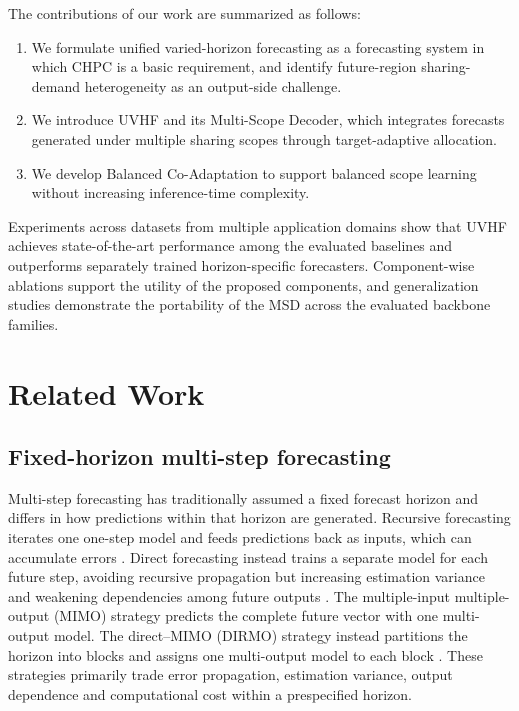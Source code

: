 \documentclass[final,3p,times]{elsarticle}
\begin{document}
The contributions of our work are summarized as follows:

\begin{enumerate}
\item We formulate unified varied-horizon forecasting as a forecasting system in which CHPC is a basic requirement, and identify future-region sharing-demand heterogeneity as an output-side challenge.
\item We introduce UVHF and its Multi-Scope Decoder, which integrates forecasts generated under multiple sharing scopes through target-adaptive allocation.
\item We develop Balanced Co-Adaptation to support balanced scope learning without increasing inference-time complexity.
\end{enumerate}

Experiments across datasets from multiple application domains show that UVHF achieves state-of-the-art performance among the evaluated baselines and outperforms separately trained horizon-specific forecasters. Component-wise ablations support the utility of the proposed components, and generalization studies demonstrate the portability of the MSD across the evaluated backbone families.

\section{Related Work}
\label{sec:related-work}


\subsection{Fixed-horizon multi-step forecasting}


Multi-step forecasting has traditionally assumed a fixed forecast horizon and differs in how predictions within that horizon are generated. Recursive forecasting iterates one one-step model and feeds predictions back as inputs, which can accumulate errors \citep{taieb2014boosting}. Direct forecasting instead trains a separate model for each future step, avoiding recursive propagation but increasing estimation variance and weakening dependencies among future outputs \citep{taieb2014boosting}. The multiple-input multiple-output (MIMO) strategy predicts the complete future vector with one multi-output model. The direct--MIMO (DIRMO) strategy instead partitions the horizon into blocks and assigns one multi-output model to each block \citep{bontempi2008mimo,taieb2012review,green2025stratify}. These strategies primarily trade error propagation, estimation variance, output dependence and computational cost within a prespecified horizon.
\end{document}
